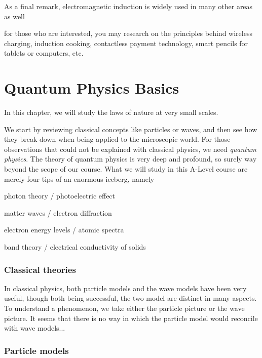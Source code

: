 \documentclass[a4paper,12pt]{book}
\begin{document}
As a final remark, electromagnetic induction is widely used in many other areas as well

for those who are interested, you may research on the principles behind wireless charging, induction cooking, contactless payment technology, smart pencils for tablets or computers, etc.

\cleardoublepage

\chapter{Quantum Physics Basics}

In this chapter, we will study the laws of nature at very small scales.

We start by reviewing classical concepts like particles or waves, and then see how they break down when being applied to the microscopic world. For those observations that could not be explained with classical physics, we need \emph{quantum physics}. The theory of quantum physics is very deep and profound, so surely way beyond the scope of our course. What we will study in this A-Level course are merely four tips of an enormous iceberg, namely

\begin{compactenum}
	\item[-] photon theory / photoelectric effect
	
	\item[-] matter waves / electron diffraction
	
	\item[-] electron energy levels / atomic spectra
	
	\item[-] band theory / electrical conductivity of solids
\end{compactenum}

\subsection{Classical theories}

In classical physics, both particle models and the wave models have been very useful, though both being successful, the two model are distinct in many aspects. To understand a phenomenon, we take either the particle picture or the wave picture. It seems that there is no way in which the particle model would reconcile with wave models...

\subsection{Particle models}
\end{document}
